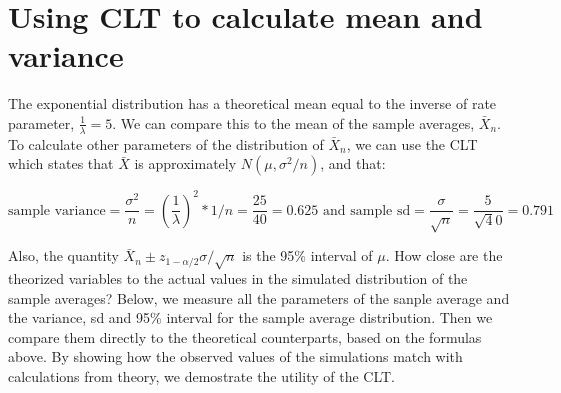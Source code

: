 \documentclass[]{article}
\begin{document}
\section{Using CLT to calculate mean and
variance}\label{using-clt-to-calculate-mean-and-variance}

The exponential distribution has a theoretical mean equal to the inverse
of rate parameter, \(\frac{1}{\lambda}=5\). We can compare this to the
mean of the sample averages, \(\bar X_n\). To calculate other parameters
of the distribution of \(\bar X_n\), we can use the CLT which states
that \(\bar X\) is approximately \(N(\mu, \sigma^2 / n)\), and that:

\[ \text{sample variance} = \frac{\sigma^2}{n} = (\frac{1}{\lambda})^2 * 1/n = \frac{25}{40} =  0.625    
\text{  and sample sd} = \frac{\sigma}{\sqrt n} = \frac{5}{\sqrt 40} = 0.791 \]

Also, the quantity \(\bar X_n \pm z_{1-\alpha/2}\sigma / \sqrt{n}\) is
the 95\% interval of \(\mu\). How close are the theorized variables to
the actual values in the simulated distribution of the sample averages?
Below, we measure all the parameters of the sanple average and the
variance, sd and 95\% interval for the sample average distribution. Then
we compare them directly to the theoretical counterparts, based on the
formulas above. By showing how the observed values of the simulations
match with calculations from theory, we demostrate the utility of the
CLT.
\end{document}
